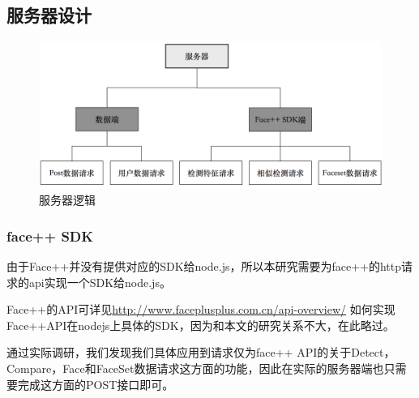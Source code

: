 \subsection{服务器设计}
\begin{figure}[h]
\centering
\includegraphics[width=\textwidth]{img/chap3/server.png}
\caption{服务器逻辑\label{Face++API}}
\end{figure}



\subsubsection{face++ SDK}
由于Face++并没有提供对应的SDK给node.js，所以本研究需要为face++的http请求的api实现一个SDK给node.js。

Face++的API可详见\url{http://www.faceplusplus.com.cn/api-overview/}
如何实现Face++API在nodejs上具体的SDK，因为和本文的研究关系不大，在此略过。

通过实际调研，我们发现我们具体应用到请求仅为face++ API的关于Detect，Compare，Face和FaceSet数据请求这方面的功能，因此在实际的服务器端也只需要完成这方面的POST接口即可。



